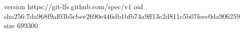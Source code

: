 version https://git-lfs.github.com/spec/v1
oid sha256:7da968f9af03b5cbee2690e446db1bfb74a9ff13e2d811c5b07feec0da906259
size 699300

